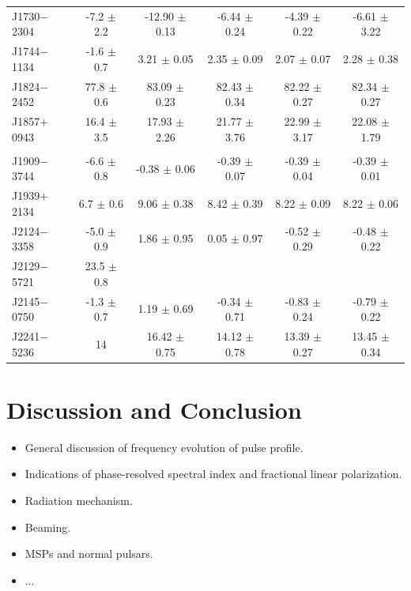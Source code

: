 \documentclass[useAMS,usenatbib]{mn2e}
\begin{document}
\begin{table}
\begin{tabular}{lccccc}
J1730$-$2304 & -7.2   $\pm$ 2.2  & -12.90  $\pm$ 0.13 & -6.44   $\pm$ 0.24 & -4.39   $\pm$ 0.22 & -6.61   $\pm$ 3.22    \\  
J1744$-$1134 & -1.6   $\pm$ 0.7  & 3.21    $\pm$ 0.05 & 2.35    $\pm$ 0.09 & 2.07    $\pm$ 0.07 & 2.28    $\pm$ 0.38    \\  
J1824$-$2452 & 77.8   $\pm$ 0.6  & 83.09   $\pm$ 0.23 & 82.43   $\pm$ 0.34 & 82.22   $\pm$ 0.27 & 82.34   $\pm$ 0.27    \\  
J1857$+$0943 & 16.4   $\pm$ 3.5  & 17.93   $\pm$ 2.26 & 21.77   $\pm$ 3.76 & 22.99   $\pm$ 3.17 & 22.08   $\pm$ 1.79    \\  
             &                   &                    &                    &                    &                       \\
J1909$-$3744 & -6.6   $\pm$ 0.8  & -0.38   $\pm$ 0.06 & -0.39   $\pm$ 0.07 & -0.39   $\pm$ 0.04 & -0.39   $\pm$ 0.01    \\  
J1939$+$2134 & 6.7    $\pm$ 0.6  & 9.06    $\pm$ 0.38 & 8.42    $\pm$ 0.39 & 8.22    $\pm$ 0.09 &  8.22   $\pm$ 0.06    \\  
J2124$-$3358 & -5.0   $\pm$ 0.9  & 1.86    $\pm$ 0.95 & 0.05    $\pm$ 0.97 & -0.52   $\pm$ 0.29 & -0.48   $\pm$ 0.22    \\  
J2129$-$5721 & 23.5   $\pm$ 0.8  &                    &                    &                    &                       \\  
J2145$-$0750 & -1.3   $\pm$ 0.7  & 1.19    $\pm$ 0.69 & -0.34   $\pm$ 0.71 & -0.83   $\pm$ 0.24 & -0.79   $\pm$ 0.22    \\  
J2241$-$5236 & 14                & 16.42   $\pm$ 0.75 & 14.12   $\pm$ 0.78 & 13.39   $\pm$ 0.27 & 13.45   $\pm$ 0.34   \\
\hline
\end{tabular}
\end{table}
 
\section{Discussion and Conclusion}

\begin{itemize}
	\item General discussion of frequency evolution of pulse profile.
	\item Indications of phase-resolved spectral index and fractional linear polarization.
	\item Radiation mechanism.
	\item Beaming.
	\item MSPs and normal pulsars.
	\item ...
\end{itemize}
\end{document}
